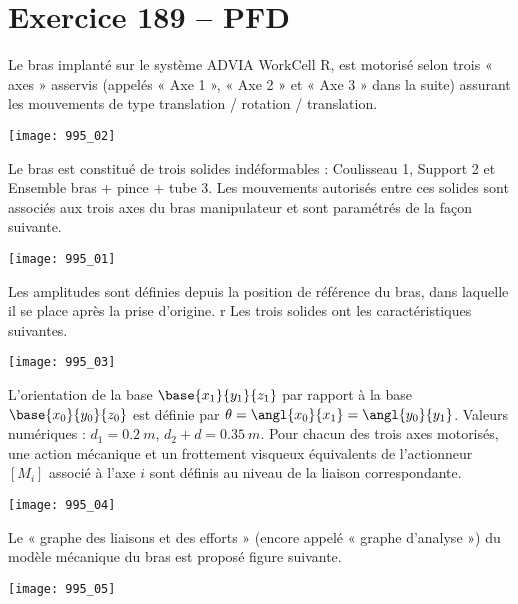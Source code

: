 \section*{Exercice 189 -- PFD}
\setcounter{exo}{0}

Le bras implanté sur le système ADVIA WorkCell R, est motorisé selon trois « axes » asservis (appelés « Axe 1 », « Axe 2 » et « Axe 3 » dans la suite) assurant les mouvements de type translation / rotation / translation.

\begin{center}
\texttt{[image: 995\_02]}
\end{center}


Le bras est constitué de trois solides indéformables : Coulisseau 1, Support 2 et Ensemble bras + pince +
tube 3. Les mouvements autorisés entre ces solides sont associés aux trois axes du bras manipulateur et sont
paramétrés de la façon suivante.

\begin{center}
\texttt{[image: 995\_01]}
\end{center}


Les amplitudes sont définies depuis la position de référence du bras, dans laquelle il se place après la prise
d’origine.
r
Les trois solides ont les caractéristiques suivantes.

\begin{center}
\texttt{[image: 995\_03]}
\end{center}

L’orientation de la base $\base{x_1}{y_1}{z_1}$ par rapport à la base $\base{x_0}{y_0}{z_0}$ est définie par $\theta  = \angl{x_0}{x_1} = \angl{y_0}{y_1}$.
Valeurs numériques : $d_1 = \SI{0,2}{m}$, $d_2 + d = \SI{0,35}{m}$.
Pour chacun des trois axes motorisés, une action mécanique et un frottement visqueux équivalents de l’actionneur
$\left[ M_i \right]$ associé à l’axe $i$ sont définis au niveau de la liaison correspondante.


\begin{center}
\texttt{[image: 995\_04]}
\end{center}

Le « graphe des liaisons et des efforts » (encore appelé « graphe d’analyse ») du modèle mécanique du bras est
proposé figure suivante.


\begin{center}
\texttt{[image: 995\_05]}
\end{center}


